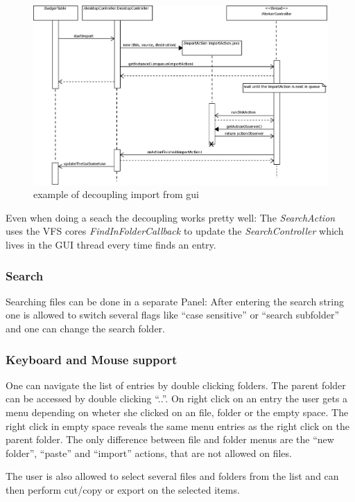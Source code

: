 \begin{figure}[h!]
\centering
\includegraphics[width=1\textwidth]{figures/single_threaded_access.eps}
\caption{example of decoupling import from gui}
\label{fig:decouple_threads}
\end{figure}

Even when doing a seach the decoupling works pretty well: The
\textit{SearchAction} uses the VFS cores \textit{FindInFolderCallback} to update
the \textit{SearchController} which lives in the GUI thread every time finds an
entry.

\subsubsection{Search}
Searching files can be done in a separate Panel: After entering the search
string one is allowed to switch several flags like ``case sensitive'' or
``search subfolder'' and one can change the search folder.


\subsubsection{Keyboard and Mouse support}
One can navigate the list of entries by double clicking folders. The parent
folder can be accessed by double clicking ``..''. On right click on an entry the
user gets a menu depending on wheter she clicked on an file, folder or the empty
space. The right click in empty space reveals the same menu entries as the right
click on the parent folder. The only difference between file and folder menus
are the ``new folder'', ``paste'' and ``import'' actions, that are not allowed
on files.

The user is also allowed to select several files and folders from the list and
can then perform cut/copy or export on the selected items. 


